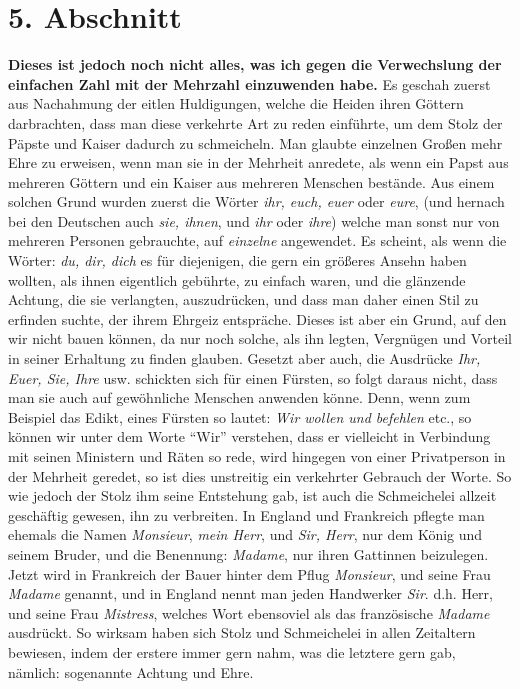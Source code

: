 \section{5. Abschnitt} \label{kap10_ab5}

\textbf{Dieses ist jedoch noch nicht alles, was ich gegen die Verwechslung der
einfachen Zahl mit der Mehrzahl einzuwenden habe.} Es geschah zuerst aus
Nachahmung der eitlen Huldigungen, welche die Heiden
ihren Göttern darbrachten,
dass man diese verkehrte Art zu reden einführte, um dem Stolz der
Päpste und
Kaiser dadurch zu schmeicheln.
Man glaubte einzelnen Großen mehr Ehre zu
erweisen, wenn man sie in der Mehrheit anredete, als wenn ein Papst aus mehreren
Göttern und ein Kaiser aus mehreren Menschen bestände. Aus einem solchen Grund
wurden zuerst die Wörter \textit{ihr, euch, euer} oder \textit{eure}, (und
hernach bei
den Deutschen auch \textit{sie, ihnen}, und \textit{ihr} oder \textit{ihre})
welche man sonst
nur von mehreren Personen gebrauchte, auf \textit{einzelne} angewendet. Es
scheint,
als wenn die Wörter: \textit{du, dir, dich} es für diejenigen, die gern ein
größeres
Ansehn haben wollten, als ihnen eigentlich gebührte, zu einfach waren, und die
glänzende Achtung, die sie verlangten, auszudrücken, und dass man daher einen
Stil zu erfinden suchte, der ihrem Ehrgeiz entspräche. Dieses ist aber ein
Grund, auf den wir nicht bauen können, da nur noch solche, als ihn legten,
Vergnügen und Vorteil in seiner Erhaltung zu finden glauben. Gesetzt aber auch,
die Ausdrücke \textit{Ihr, Euer, Sie, Ihre} usw. schickten sich für einen
Fürsten,
so folgt daraus nicht, dass man sie auch auf gewöhnliche Menschen anwenden
könne.
Denn, wenn zum Beispiel das Edikt,
eines Fürsten so lautet: \textit{Wir wollen und
befehlen}
etc., so können wir unter dem Worte "`Wir"' verstehen, dass er vielleicht in
Verbindung mit seinen Ministern und Räten so rede, wird hingegen von einer
Privatperson in der Mehrheit geredet, so ist dies unstreitig ein verkehrter
Gebrauch der Worte. So wie jedoch der Stolz ihm seine Entstehung gab, ist auch
die Schmeichelei allzeit geschäftig gewesen, ihn zu verbreiten. In England und
Frankreich pflegte man ehemals die Namen \textit{Monsieur}, \textit{mein
Herr}, und
\textit{Sir, Herr}, nur dem König und seinem Bruder, und die Benennung:
\textit{Madame},
nur ihren Gattinnen beizulegen. Jetzt wird in Frankreich der
Bauer hinter dem
Pflug \textit{Monsieur}, und seine Frau \textit{Madame} genannt, und in England
nennt man
jeden Handwerker \textit{Sir}. d.h. Herr, und
seine
Frau \textit{Mistress}, welches Wort
ebensoviel als das französische \textit{Madame} ausdrückt. So wirksam haben sich
Stolz und
Schmeichelei in allen Zeitaltern bewiesen, indem der erstere immer gern nahm,
was die letztere gern gab, nämlich: sogenannte Achtung und Ehre.

